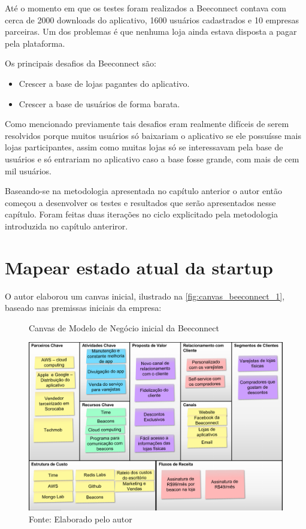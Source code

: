 Até o momento em que os testes foram realizados a Beeconnect contava com cerca de 2000 downloads do aplicativo, 1600 usuários cadastrados e 10 empresas parceiras. Um dos problemas é que nenhuma loja ainda estava disposta a pagar pela plataforma.

Os principais desafios da Beeconnect são:
\begin{itemize}
\item Crescer a base de lojas pagantes do aplicativo.
\item Crescer a base de usuários de forma barata.
\end{itemize}

Como mencionado previamente tais desafios eram realmente difíceis de serem resolvidos porque muitos usuários só baixariam o aplicativo se ele possuísse mais lojas participantes, assim como muitas lojas só se interessavam pela base de usuários e só entrariam no aplicativo caso a base fosse grande, com mais de cem mil usuários.

Baseando-se na metodologia apresentada no capítulo anterior o autor então começou a desenvolver os testes e resultados que serão apresentados nesse capítulo. Foram feitas duas iterações no ciclo explicitado pela metodologia introduzida no capítulo anteriror.

\section{Mapear estado atual da startup}
\label{cha:mapear_estado}
O autor elaborou um canvas inicial, ilustrado na \autoref{fig:canvas_beeconnect_1}, baseado nas premissas iniciais da empresa: 

\begin{figure}[H]
\caption{Canvas de Modelo de Negócio inicial da Beeconnect}
\centerline{\includegraphics[scale=0.25]{img/canvas_beeconnect_1}}
\label{fig:canvas_beeconnect_1}
\caption* {Fonte: Elaborado pelo autor}
\end{figure}

